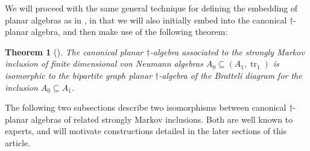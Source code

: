 \documentclass[11pt]{article}
\theoremstyle{plain}
\newtheorem{thm}{Theorem}[section]
\theoremstyle{definition}
\DeclareMathOperator{\tr}{tr}
\begin{document}
% 

We will proceed with the same general technique for defining the embedding of planar algebras as in \cite{MR2812459}, in that we will also initially embed into the canonical $\dag$-planar algebra, and then make use of the following theorem:

\begin{thm}[{\cite[Theorem 3.28]{MR2812459}}] \label{planaralgebraisomorphism}
The canonical planar $\dag$-algebra associated to the strongly Markov inclusion of finite dimensional von Neumann algebras $A_0\subseteq (A_1,\tr_1)$ is isomorphic to the bipartite graph planar $\dag$-algebra of the Bratteli diagram for the inclusion $A_0\subseteq A_1$.
\end{thm}

The following two subsections  describe two isomorphisms between canonical $\dag$-planar algebras of related strongly Markov inclusions. 
Both are well known to experts, and will motivate constructions detailed in the later sections of this article.
\end{document}
